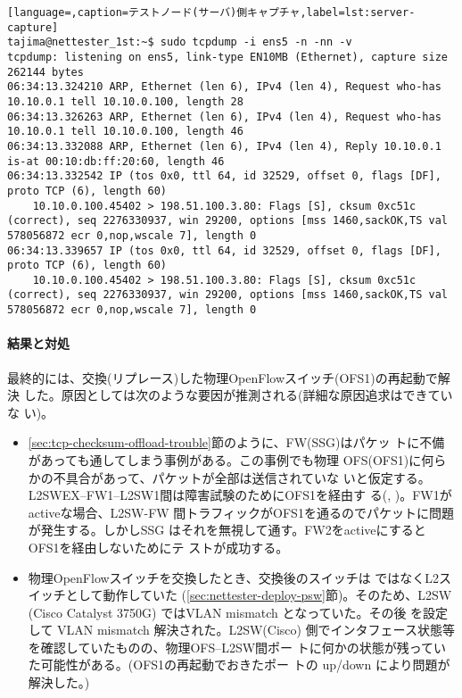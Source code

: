 \begin{lstlisting}[language=,caption=テストノード(サーバ)側キャプチャ,label=lst:server-capture]
tajima@nettester_1st:~$ sudo tcpdump -i ens5 -n -nn -v
tcpdump: listening on ens5, link-type EN10MB (Ethernet), capture size 262144 bytes
06:34:13.324210 ARP, Ethernet (len 6), IPv4 (len 4), Request who-has 10.10.0.1 tell 10.10.0.100, length 28
06:34:13.326263 ARP, Ethernet (len 6), IPv4 (len 4), Request who-has 10.10.0.1 tell 10.10.0.100, length 46
06:34:13.332088 ARP, Ethernet (len 6), IPv4 (len 4), Reply 10.10.0.1 is-at 00:10:db:ff:20:60, length 46
06:34:13.332542 IP (tos 0x0, ttl 64, id 32529, offset 0, flags [DF], proto TCP (6), length 60)
    10.10.0.100.45402 > 198.51.100.3.80: Flags [S], cksum 0xc51c (correct), seq 2276330937, win 29200, options [mss 1460,sackOK,TS val 578056872 ecr 0,nop,wscale 7], length 0
06:34:13.339657 IP (tos 0x0, ttl 64, id 32529, offset 0, flags [DF], proto TCP (6), length 60)
    10.10.0.100.45402 > 198.51.100.3.80: Flags [S], cksum 0xc51c (correct), seq 2276330937, win 29200, options [mss 1460,sackOK,TS val 578056872 ecr 0,nop,wscale 7], length 0
\end{lstlisting}

    \paragraph{結果と対処}

最終的には、交換(リプレース)した物理OpenFlowスイッチ(OFS1)の再起動で解決
した。原因としては次のような要因が推測される(詳細な原因追求はできていな
い)。
\begin{itemize}
 \item \ref{sec:tcp-checksum-offload-trouble}節のように、FW(SSG)はパケッ
       トに不備があっても通してしまう事例がある。この事例でも物理
       OFS(OFS1)に何らかの不具合があって、パケットが全部は送信されていな
       いと仮定する。L2SWEX--FW1--L2SW1間は障害試験のためにOFS1を経由す
       る(,
       )。FW1がactiveな場合、L2SW-FW
       間トラフィックがOFS1を通るのでパケットに問題が発生する。しかしSSG
       はそれを無視して通す。FW2をactiveにするとOFS1を経由しないためにテ
       ストが成功する。
 \item 物理OpenFlowスイッチを交換したとき、交換後のスイッチは
       ではなくL2スイッチとして動作していた
       (\ref{sec:nettester-deploy-psw}節)。そのため、L2SW (Cisco
       Catalyst 3750G) ではVLAN mismatch となっていた。その後
       を設定して VLAN mismatch 解決された。L2SW(Cisco)
       側でインタフェース状態等を確認していたものの、物理OFS--L2SW間ポー
       トに何かの状態が残っていた可能性がある。(OFS1の再起動でおきたポー
       トの up/down により問題が解決した。)
\end{itemize}

